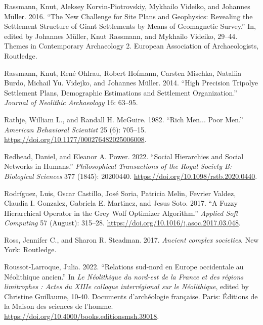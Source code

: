 \documentclass[
  12pt,
  a4paper, twoside]{book}
\newlength{\cslhangindent}
\newlength{\cslentryspacingunit} %
\newenvironment{CSLReferences}[2] %
 {%
  \setlength{\parindent}{0pt}
  \ifodd #1
  \let\oldpar\par
  \def\par{\hangindent=\cslhangindent\oldpar}
  \fi
  \setlength{\parskip}{#2\cslentryspacingunit}
 }%
 {}
\begin{document}
\begin{CSLReferences}{1}{0}
\leavevmode{}%
Rassmann, Knut, Aleksey Korvin-Piotrovskiy, Mykhailo Videiko, and Johannes Müller. 2016. {``The New Challenge for Site Plans and Geophysics: Revealing the Settlement Structure of Giant Settlements by Means of Geomagnetic Survey.''} In, edited by Johannes Müller, Knut Rassmann, and Mykhailo Videiko, 29--44. Themes in Contemporary Archaeology 2. European Association of Archaeologists, Routledge.

\leavevmode{}%
Rassmann, Knut, René Ohlrau, Robert Hofmann, Carsten Mischka, Nataliia Burdo, Michail Yu. Videjko, and Johannes Müller. 2014. {``High Precision Tripolye Settlement Plans, Demographic Estimations and Settlement Organization.''} \emph{Journal of Neolithic Archaeology} 16: 63--95.

\leavevmode{}%
Rathje, William L., and Randall H. McGuire. 1982. {``Rich Men... Poor Men.''} \emph{American Behavioral Scientist} 25 (6): 705--15. \url{https://doi.org/10.1177/000276482025006008}.

\leavevmode{}%
Redhead, Daniel, and Eleanor A. Power. 2022. {``Social Hierarchies and Social Networks in Humans.''} \emph{Philosophical Transactions of the Royal Society B: Biological Sciences} 377 (1845): 20200440. \url{https://doi.org/10.1098/rstb.2020.0440}.

\leavevmode{}%
Rodríguez, Luis, Oscar Castillo, José Soria, Patricia Melin, Fevrier Valdez, Claudia I. Gonzalez, Gabriela E. Martinez, and Jesus Soto. 2017. {``A Fuzzy Hierarchical Operator in the Grey Wolf Optimizer Algorithm.''} \emph{Applied Soft Computing} 57 (August): 315--28. \url{https://doi.org/10.1016/j.asoc.2017.03.048}.

\leavevmode{}%
Ross, Jennifer C., and Sharon R. Steadman. 2017. \emph{Ancient complex societies}. New York: Routledge.

\leavevmode{}%
Roussot‑Larroque, Julia. 2022. {``Relations sud‑nord en Europe occidentale au Néolithique ancien.''} In \emph{Le Néolithique du nord-est de la France et des régions limitrophes : Actes du XIIIe colloque interrégional sur le Néolithique}, edited by Christine Guillaume, 10‑40. Documents d'archéologie française. {Paris}: {Éditions de la Maison des sciences de l'homme}. \url{https://doi.org/10.4000/books.editionsmsh.39018}.


\end{CSLReferences}
\end{document}
